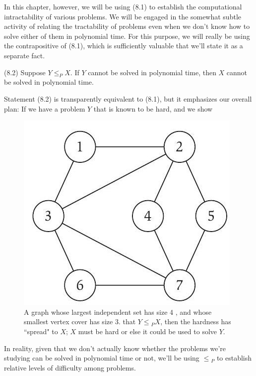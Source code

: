 \documentclass[a4paper, 12pt]{book}
\theoremstyle{dotless}
\begin{document}
In this chapter, however, we will be using (8.1) to establish the computational intractability of various problems. We will be engaged in the somewhat subtle activity of relating the tractability of problems even when we don't know how to solve either of them in polynomial time. For this purpose, we will really be using the contrapositive of (8.1), which is sufficiently valuable that we'll state it as a separate fact.

(8.2) Suppose $Y \leq_{P} X$. If $Y$ cannot be solved in polynomial time, then $X$ cannot be solved in polynomial time.

Statement (8.2) is transparently equivalent to (8.1), but it emphasizes our overall plan: If we have a problem $Y$ that is known to be hard, and we show

\begin{figure}
    \centering
\includegraphics[width=\textwidth]{Imagenes-Seccion8/2023_01_31_032b090513e1f42dd22ag-04.jpg}    \caption{A graph whose largest independent set has size 4 , and whose smallest vertex cover has size 3. that $Y \leq{ }_{P} X$, then the hardness has ``spread" to $X$; $X$ must be hard or else it could be used to solve $Y$.}
    \label{fig:8_1}
\end{figure}

In reality, given that we don't actually know whether the problems we're studying can be solved in polynomial time or not, we'll be using $\leq{ }_{P}$ to establish relative levels of difficulty among problems.
\end{document}
